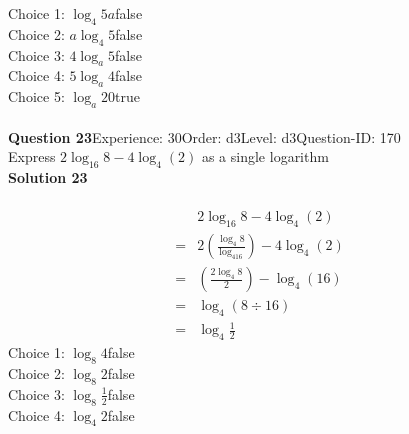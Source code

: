 \documentclass{article}
\begin{document}
Choice 1: \hspace{20pt}$\log_{4}5a$\hspace{20pt}false\\
Choice 2: \hspace{20pt}$a\log_{4}5$\hspace{20pt}false\\
Choice 3: \hspace{20pt}$4\log_{a}5$\hspace{20pt}false\\
Choice 4: \hspace{20pt}$5\log_{a}4$\hspace{20pt}false\\
Choice 5: \hspace{20pt}$\log_{a}20$\hspace{20pt}true\\
\\[4pt]
\noindent\textbf{Question 23}\hspace{20pt}Experience: 30\hspace{20pt}Order: d3\hspace{20pt}Level: d3\hspace{20pt}Question-ID: 170\\[2pt]
Express $2\log_{16}8-4\log_{4}(2)$ as a single logarithm\\[4pt]
\noindent\textbf{Solution 23}\\[2pt]
\\[-35pt]\begin{align*}
&2\log_{16}8-4\log_{4}(2)\\[2pt]
=&2\left(\displaystyle\frac{\log_{4}8}{\log_416}\right)-4\log_{4}(2)\\[2pt]
=&\left(\displaystyle\frac{2\log_{4}8}{2}\right)-\log_{4}(16)\\[2pt]
=&\log_{4}(8 \div 16)\\[2pt]
=&\log_{4}\displaystyle\frac{1}{2}
\end{align*}
Choice 1: \hspace{20pt}$\log_{8}4$\hspace{20pt}false\\
Choice 2: \hspace{20pt}$\log_{8}2$\hspace{20pt}false\\
Choice 3: \hspace{20pt}$\log_{8}\displaystyle\frac{1}{2}$\hspace{20pt}false\\
Choice 4: \hspace{20pt}$\log_{4}2$\hspace{20pt}false\\
\end{document}
